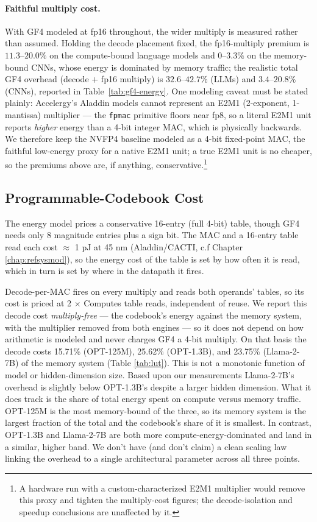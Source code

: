 \paragraph{Faithful multiply cost.} With GF4 modeled at fp16 throughout, the
wider multiply is measured rather than assumed. Holding the decode placement
fixed, the fp16-multiply premium is $11.3$--$20.0\%$ on the compute-bound language models
and $0$--$3.3\%$ on the memory-bound CNNs, whose energy is dominated by memory
traffic; the realistic total GF4 overhead (decode $+$ fp16 multiply) is
$32.6$--$42.7\%$ (LLMs) and $3.4$--$20.8\%$ (CNNs), reported in
Table~\ref{tab:gf4-energy}. One modeling caveat must be stated plainly: Accelergy's
Aladdin models cannot represent an E2M1 (2-exponent, 1-mantissa) multiplier ---
the \texttt{fpmac} primitive floors near fp8, so a literal E2M1 unit reports
\emph{higher} energy than a 4-bit integer MAC, which is physically backwards. We
therefore keep the NVFP4 baseline modeled as a 4-bit fixed-point MAC, the
faithful low-energy proxy for a native E2M1 unit; a true E2M1 unit is no cheaper,
so the premiums above are, if anything, conservative.\footnote{A hardware run
with a custom-characterized E2M1 multiplier would remove this proxy and tighten
the multiply-cost figures; the decode-isolation and speedup conclusions are
unaffected by it.}


\subsection{Programmable-Codebook Cost}\label{subsec:progcode}

The energy model prices a conservative 16-entry (full 4-bit) table, though GF4
needs only 8 magnitude entries plus a sign bit. The MAC and a 16-entry table
read each cost $\approx$ 1 pJ at 45 nm (Aladdin/CACTI, c.f Chapter
\ref{chap:refsysmod}), so the energy cost of the table is set by how often it is
read, which in turn is set by where in the datapath it fires.

Decode-per-MAC fires on every multiply and reads both operands' tables, so its
cost is priced at 2 $\times$ Computes table reads, independent of reuse. We report
this decode cost \emph{multiply-free} --- the codebook's energy against the
memory system, with the multiplier removed from both engines --- so it does not
depend on how arithmetic is modeled and never charges GF4 a 4-bit multiply. On
that basis the decode costs 15.71\% (OPT-125M), 25.62\% (OPT-1.3B), and 23.75\%
(Llama-2-7B) of the memory system (Table \ref{tab:lut}). This is not a monotonic
function of model or hidden-dimension size. Based upon our measurements
Llama-2-7B's overhead is slightly below OPT-1.3B's despite a larger hidden
dimension. What it does track is the share of total energy spent on compute
versus memory traffic. OPT-125M is the most memory-bound of the three, so its
memory system is the largest fraction of the total and the codebook's share of
it is smallest. In contrast, OPT-1.3B and Llama-2-7B are both more
compute-energy-dominated and land in a similar, higher band. We don't have (and
don't claim) a clean scaling law linking the overhead to a single architectural
parameter across all three points.

